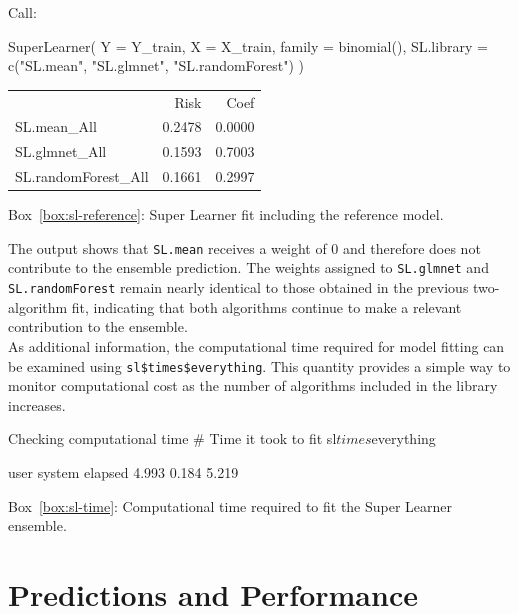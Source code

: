 \documentclass[12pt]{article}
\newcommand{\routputcaption}[2]{%
    \par\smallskip
    \begin{center}
        Box~\ref{#1}: #2
    \end{center}
}
\begin{document}
\begin{routputboxref}[label={box:sl-reference}]
	\ttfamily
	\raggedright
	
	Call:
	
	SuperLearner(
	Y = Y\_train, X = X\_train, family = binomial(),
	SL.library = c("SL.mean", "SL.glmnet", "SL.randomForest")
	)
	
	\medskip
	
	\centering
	\begin{tabular}{lrr}
		& Risk & Coef \\
		SL.mean\_All         & 0.2478 & 0.0000 \\
		SL.glmnet\_All       & 0.1593 & 0.7003 \\
		SL.randomForest\_All & 0.1661 & 0.2997 \\
	\end{tabular}
\end{routputboxref}

\routputcaption{box:sl-reference}
{Super Learner fit including the reference model.}

The output shows that \texttt{SL.mean} receives a weight of $0$ and therefore does 
not contribute to the ensemble prediction. The weights assigned to 
\texttt{SL.glmnet} and \texttt{SL.randomForest} remain nearly identical to those 
obtained in the previous two-algorithm fit, indicating that both algorithms continue 
to make a relevant contribution to the ensemble. \\
As additional information, the computational time required for model fitting can be 
examined using \texttt{sl\$times\$everything}. This quantity provides a simple way to 
monitor computational cost as the number of algorithms included in the library 
increases.

\begin{rcode}[label={code:sl-time}]{Checking computational time}
# Time it took to fit
sl$times$everything
\end{rcode}

\begin{routputref}[label={box:sl-time}]
	user  system elapsed 
	4.993   0.184   5.219 
\end{routputref}

\routputcaption{box:sl-time}
{Computational time required to fit the Super Learner ensemble.}

\section{Predictions and Performance}
\end{document}

